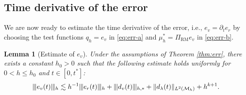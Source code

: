 \documentclass[11pt,a4paper,oneside,reqno]{amsart}
\theoremstyle{definition}
\theoremstyle{plain}
\newtheorem{lemma}{Lemma}
\numberwithin{theorem}{section}
\numberwithin{proposition}{section}
\numberwithin{lemma}{section}
\numberwithin{equation}{section}
\newcommand{\Man}{\mathcal{M}}
\newcommand{\RM}{\mathrm{RM}}
\newcommand{\normt}[1]{%
	\vert\kern-0.9pt\vert\kern-0.9pt\vert #1
	\vert\kern-0.9pt\vert\kern-0.9pt\vert}
\begin{document}
\subsection{Time derivative of the error}

We are now ready to estimate the time derivative of the error, i.e., $e_{v} = \partial_t e_r$
by choosing the test functions \( q_h = e_{v} \) in \eqref{eq:err-a} and \( \mu_h^* = \Pi_{\RM} e_{v} \) in \eqref{eq:err-b}. 
\begin{lemma}[Estimate of \( e_v \)]\label{lm:esti_ev}
    Under the assumptions of Theorem \ref{thm:err}, there exists a constant $h_0 > 0$ such that the following estimate holds uniformly for $0<h\leq h_0$ and $t\in[0,t^{*}]${\rm:}
    \[
    \normt{e_v(t) }_h\lesssim h^{-1} \normt{e_r(t)}_h + \normt{d_v(t)}_{h,*} + \|d_\lambda(t)\|_{L^2(\Man_h)} + h^{k+1}.
    \]
\end{lemma}
\end{document}
